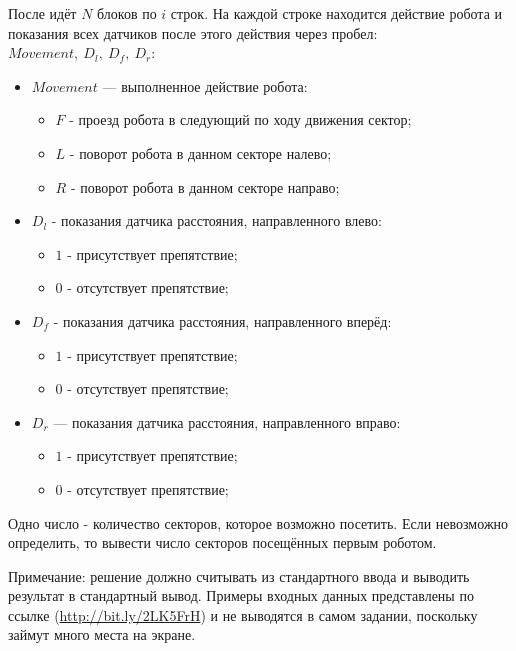 После идёт $N$ блоков по $i$ строк. На каждой строке находится действие робота и показания всех датчиков 
после этого действия через пробел: $Movement, ~ D_l,~ D_f, ~D_r$: 

\begin{itemize}
    \item $Movement$ --- выполненное действие робота:
    \begin{itemize}
        \item $F$ - проезд робота в следующий по ходу движения сектор;
        \item $L$ - поворот робота в данном секторе налево;
        \item $R$ - поворот робота в данном секторе направо;
    \end{itemize}
    \item $D_l$ - показания датчика расстояния, направленного влево:
    \begin{itemize}
        \item $1$ - присутствует препятствие;
        \item $0$ - отсутствует препятствие;
    \end{itemize}
    \item $D_f$ - показания датчика расстояния, направленного вперёд:
    \begin{itemize}
        \item $1$ - присутствует препятствие;
        \item $0$ - отсутствует препятствие;
    \end{itemize}
    \item $D_r$ --- показания датчика расстояния, направленного вправо:\begin{itemize}
        \item $1$ - присутствует препятствие;
        \item $0$ - отсутствует препятствие;
    \end{itemize}
\end{itemize}

\outputfmtSection

Одно число - количество секторов, которое возможно посетить. Если невозможно определить, то вывести число секторов посещённых первым роботом.

Примечание: решение должно считывать из стандартного ввода и выводить результат в стандартный вывод. 
Примеры входных данных представлены по ссылке (\url{http://bit.ly/2LK5FrH}) и не выводятся в самом задании, поскольку займут много места на экране.

